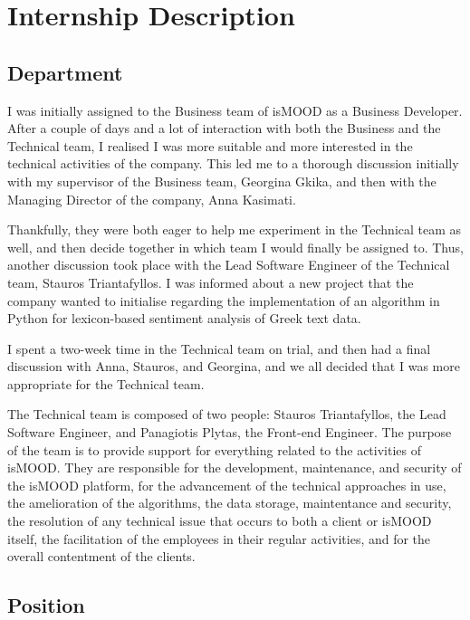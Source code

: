 \section{Internship Description}
\label{sec:internship}

\subsection{Department}
\label{subsec:department}

I was initially assigned to the Business team of isMOOD
as a Business Developer.
After a couple of days and a lot of interaction
with both the Business and the Technical team,
I realised I was more suitable
and more interested in the technical activities
of the company.
This led me to a thorough discussion
initially with my supervisor of the Business team, Georgina Gkika,
and then with the Managing Director of the company,
Anna Kasimati.

Thankfully, they were both eager
to help me experiment in the Technical team as well,
and then decide together in which team
I would finally be assigned to.
Thus, another discussion took place
with the Lead Software Engineer of the Technical team,
Stauros Triantafyllos.
I was informed about a new project
that the company wanted to initialise
regarding the implementation of an algorithm in Python
for lexicon-based sentiment analysis of Greek text data.

I spent a two-week time in the Technical team on trial,
and then had a final discussion with Anna, Stauros, and Georgina,
and we all decided that I was more appropriate for the Technical team.

The Technical team is composed of two people:
Stauros Triantafyllos, the Lead Software Engineer,
and Panagiotis Plytas, the Front-end Engineer.
The purpose of the team is to provide support
for everything related to the activities of isMOOD.
They are responsible for the development, maintenance,
and security of the isMOOD platform,
for the advancement of the technical approaches in use,
the amelioration of the algorithms,
the data storage, maintentance and security,
the resolution of any technical issue that occurs
to both a client or isMOOD itself,
the facilitation of the employees in their regular activities,
and for the overall contentment of the clients.

\subsection{Position}
\label{subsec:position}


